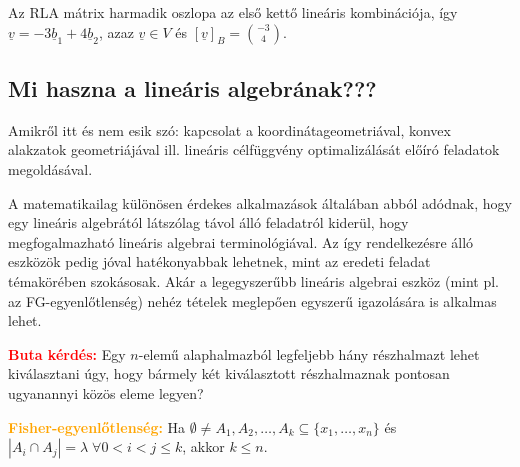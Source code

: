 \documentclass[../szamtud.tex]{subfiles}
\begin{document}
        Az RLA mátrix harmadik oszlopa az első kettő lineáris kombinációja, így $\underline{v} = -3\underline{b}_1 + 4\underline{b}_2$, azaz $\underline{v} \in V$ és $[\underline{v}]_B = \binom{-3}{4}$.

    \subsection{Mi haszna a lineáris algebrának???}

        Amikről itt és nem esik szó: kapcsolat a koordinátageometriával, konvex alakzatok geometriájával ill. lineáris célfüggvény optimalizálását előíró feladatok megoldásával. 

        A matematikailag különösen érdekes alkalmazások általában abból adódnak, hogy egy lineáris algebrától látszólag távol álló feladatról kiderül, hogy megfogalmazható lineáris algebrai terminológiával. Az így rendelkezésre álló eszközök pedig jóval hatékonyabbak lehetnek, mint az eredeti feladat témakörében szokásosak. Akár a legegyszerűbb lineáris algebrai eszköz (mint pl. az FG-egyenlőtlenség) nehéz tételek meglepően egyszerű igazolására is alkalmas lehet.

        \textcolor{red}{\textbf{Buta kérdés:}} Egy $n$-elemű alaphalmazból legfeljebb hány részhalmazt lehet kiválasztani úgy, hogy bármely két kiválasztott részhalmaznak pontosan ugyanannyi közös eleme legyen?

        \textcolor{orange}{\textbf{Fisher-egyenlőtlenség:}} Ha $\emptyset \neq A_1, A_2, \dots, A_k \subseteq \{x_1, \dots, x_n\}$ és $|A_i \cap A_j| = \lambda \; \forall 0 < i < j \leq k$, akkor $k \leq n$.
\end{document}
